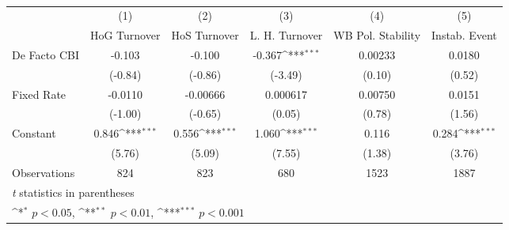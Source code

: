 \begin{table}[htbp]\centering
\def\sym#1{\ifmmode^{#1}\else\(^{#1}\)\fi}
\caption{\label{hkmultIndFEDF}}
\begin{tabular}{l*{5}{c}}
\toprule
                                        &\multicolumn{1}{c}{(1)}&\multicolumn{1}{c}{(2)}&\multicolumn{1}{c}{(3)}&\multicolumn{1}{c}{(4)}&\multicolumn{1}{c}{(5)}\\
                                        &\multicolumn{1}{c}{HoG Turnover}&\multicolumn{1}{c}{HoS Turnover}&\multicolumn{1}{c}{L. H. Turnover}&\multicolumn{1}{c}{WB Pol. Stability}&\multicolumn{1}{c}{Instab. Event}\\
\midrule
De Facto CBI                            &   -0.103         &   -0.100         &   -0.367\sym{***}&  0.00233         &   0.0180         \\
                                        &  (-0.84)         &  (-0.86)         &  (-3.49)         &   (0.10)         &   (0.52)         \\
\addlinespace
Fixed Rate                              &  -0.0110         & -0.00666         & 0.000617         &  0.00750         &   0.0151         \\
                                        &  (-1.00)         &  (-0.65)         &   (0.05)         &   (0.78)         &   (1.56)         \\
\addlinespace
Constant                                &    0.846\sym{***}&    0.556\sym{***}&    1.060\sym{***}&    0.116         &    0.284\sym{***}\\
                                        &   (5.76)         &   (5.09)         &   (7.55)         &   (1.38)         &   (3.76)         \\
\midrule
Observations                            &      824         &      823         &      680         &     1523         &     1887         \\
\bottomrule
\multicolumn{6}{l}{\footnotesize \textit{t} statistics in parentheses}\\
\multicolumn{6}{l}{\footnotesize \sym{*} \(p<0.05\), \sym{**} \(p<0.01\), \sym{***} \(p<0.001\)}\\
\end{tabular}
\end{table}
